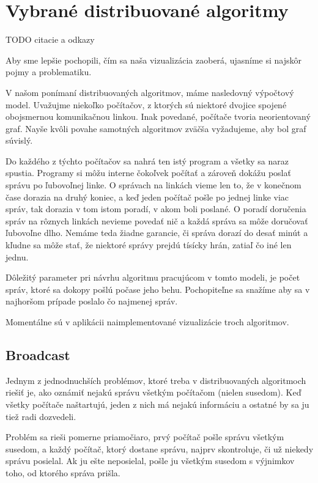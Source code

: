 \section{Vybrané distribuované algoritmy}
TODO citacie a odkazy

Aby sme lepšie pochopili, čím sa naša vizualizácia zaoberá, ujasníme si najskôr pojmy a problematiku.

V našom ponímaní distribuovaných algoritmov, máme nasledovný výpočtový model.
Uvažujme niekoľko počítačov, z ktorých sú niektoré dvojice spojené obojsmernou komunikačnou linkou.
Inak povedané, počítače tvoria neorientovaný graf. Nayše kvôli povahe samotných algoritmov zväčša vyžadujeme,
aby bol graf súvislý.

Do každého z týchto počítačov sa nahrá ten istý program a všetky sa naraz spustia. Programy si môžu
interne čokoľvek počítať a zároveň dokážu poslať správu po ľubovoľnej linke. O správach na linkách
vieme len to, že v konečnom čase dorazia na druhý koniec, a keď jeden počítač pošle po jednej linke
viac správ, tak dorazia v tom istom poradí, v akom boli poslané. O poradí doručenia správ na rôznych
linkách nevieme povedať nič a každá správa sa môže doručovať ľubovoľne dlho. Nemáme teda žiadne garancie, či
správa dorazí do desať minút a kľudne sa môže stať, že niektoré správy prejdú tísícky hrán, zatiaľ čo
iné len jednu.

Dôležitý parameter pri návrhu algoritmu pracujúcom v tomto modeli, je počet správ, ktoré sa dokopy
pošlú počase jeho behu. Pochopiteľne sa snažíme aby sa v najhoršom prípade poslalo čo najmenej
správ.

Momentálne sú v aplikácii naimplementované vizualizácie troch algoritmov.

\subsection{Broadcast}

Jednym z jednodnuchších problémov, ktoré treba v distribuovaných algoritmoch riešiť je, ako 
oznámiť nejakú správu všetkým počítačom (nielen susedom). Keď všetky počítače naštartujú, 
jeden z nich má nejakú informáciu a ostatné by sa ju tiež radi dozvedeli.

Problém sa rieši pomerne priamočiaro, prvý počítač pošle správu všetkým susedom, a každý
počítač, ktorý dostane správu, najprv skontroluje, či už niekedy správu posielal. 
Ak ju ešte neposielal, pošle ju všetkým susedom s výjnimkov toho, od ktorého správa prišla.


